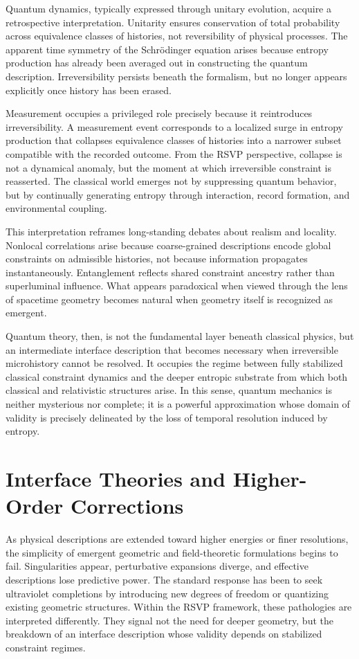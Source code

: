 \documentclass[11pt]{article}
\begin{document}
Quantum dynamics, typically expressed through unitary evolution, acquire a retrospective interpretation. Unitarity ensures conservation of total probability across equivalence classes of histories, not reversibility of physical processes. The apparent time symmetry of the Schrödinger equation arises because entropy production has already been averaged out in constructing the quantum description. Irreversibility persists beneath the formalism, but no longer appears explicitly once history has been erased.

Measurement occupies a privileged role precisely because it reintroduces irreversibility. A measurement event corresponds to a localized surge in entropy production that collapses equivalence classes of histories into a narrower subset compatible with the recorded outcome. From the RSVP perspective, collapse is not a dynamical anomaly, but the moment at which irreversible constraint is reasserted. The classical world emerges not by suppressing quantum behavior, but by continually generating entropy through interaction, record formation, and environmental coupling.

This interpretation reframes long-standing debates about realism and locality. Nonlocal correlations arise because coarse-grained descriptions encode global constraints on admissible histories, not because information propagates instantaneously. Entanglement reflects shared constraint ancestry rather than superluminal influence. What appears paradoxical when viewed through the lens of spacetime geometry becomes natural when geometry itself is recognized as emergent.

Quantum theory, then, is not the fundamental layer beneath classical physics, but an intermediate interface description that becomes necessary when irreversible microhistory cannot be resolved. It occupies the regime between fully stabilized classical constraint dynamics and the deeper entropic substrate from which both classical and relativistic structures arise. In this sense, quantum mechanics is neither mysterious nor complete; it is a powerful approximation whose domain of validity is precisely delineated by the loss of temporal resolution induced by entropy.

\section{Interface Theories and Higher-Order Corrections}

As physical descriptions are extended toward higher energies or finer resolutions, the simplicity of emergent geometric and field-theoretic formulations begins to fail. Singularities appear, perturbative expansions diverge, and effective descriptions lose predictive power. The standard response has been to seek ultraviolet completions by introducing new degrees of freedom or quantizing existing geometric structures. Within the RSVP framework, these pathologies are interpreted differently. They signal not the need for deeper geometry, but the breakdown of an interface description whose validity depends on stabilized constraint regimes.
\end{document}
